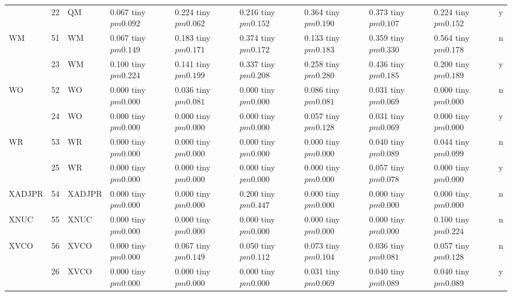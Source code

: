 \begin{table}
\begin{tabular}{llllllllll}
 & 22 & QM & 0.067 tiny $ pm 0.092$ & 0.224 tiny $ pm 0.062$ & 0.216 tiny $ pm 0.152$ & 0.364 tiny $ pm 0.190$ & 0.373 tiny $ pm 0.107$ & 0.224 tiny $ pm 0.152$ & y \\
\cline{1-10}
\multirow[t]{2}{*}{WM} & 51 & WM & 0.067 tiny $ pm 0.149$ & 0.183 tiny $ pm 0.171$ & 0.374 tiny $ pm 0.172$ & 0.133 tiny $ pm 0.183$ & 0.359 tiny $ pm 0.330$ & 0.564 tiny $ pm 0.178$ & n \\
 & 23 & WM & 0.100 tiny $ pm 0.224$ & 0.141 tiny $ pm 0.199$ & 0.337 tiny $ pm 0.208$ & 0.258 tiny $ pm 0.280$ & 0.436 tiny $ pm 0.185$ & 0.200 tiny $ pm 0.189$ & y \\
\cline{1-10}
\multirow[t]{2}{*}{WO} & 52 & WO & 0.000 tiny $ pm 0.000$ & 0.036 tiny $ pm 0.081$ & 0.000 tiny $ pm 0.000$ & 0.086 tiny $ pm 0.081$ & 0.031 tiny $ pm 0.069$ & 0.000 tiny $ pm 0.000$ & n \\
 & 24 & WO & 0.000 tiny $ pm 0.000$ & 0.000 tiny $ pm 0.000$ & 0.000 tiny $ pm 0.000$ & 0.057 tiny $ pm 0.128$ & 0.031 tiny $ pm 0.069$ & 0.000 tiny $ pm 0.000$ & y \\
\cline{1-10}
\multirow[t]{2}{*}{WR} & 53 & WR & 0.000 tiny $ pm 0.000$ & 0.000 tiny $ pm 0.000$ & 0.000 tiny $ pm 0.000$ & 0.000 tiny $ pm 0.000$ & 0.040 tiny $ pm 0.089$ & 0.044 tiny $ pm 0.099$ & n \\
 & 25 & WR & 0.000 tiny $ pm 0.000$ & 0.000 tiny $ pm 0.000$ & 0.000 tiny $ pm 0.000$ & 0.000 tiny $ pm 0.000$ & 0.057 tiny $ pm 0.078$ & 0.000 tiny $ pm 0.000$ & y \\
\cline{1-10}
XADJPR & 54 & XADJPR & 0.000 tiny $ pm 0.000$ & 0.000 tiny $ pm 0.000$ & 0.200 tiny $ pm 0.447$ & 0.000 tiny $ pm 0.000$ & 0.000 tiny $ pm 0.000$ & 0.000 tiny $ pm 0.000$ & n \\
\cline{1-10}
XNUC & 55 & XNUC & 0.000 tiny $ pm 0.000$ & 0.000 tiny $ pm 0.000$ & 0.000 tiny $ pm 0.000$ & 0.000 tiny $ pm 0.000$ & 0.000 tiny $ pm 0.000$ & 0.100 tiny $ pm 0.224$ & n \\
\cline{1-10}
\multirow[t]{2}{*}{XVCO} & 56 & XVCO & 0.000 tiny $ pm 0.000$ & 0.067 tiny $ pm 0.149$ & 0.050 tiny $ pm 0.112$ & 0.073 tiny $ pm 0.104$ & 0.036 tiny $ pm 0.081$ & 0.057 tiny $ pm 0.128$ & n \\
 & 26 & XVCO & 0.000 tiny $ pm 0.000$ & 0.000 tiny $ pm 0.000$ & 0.000 tiny $ pm 0.000$ & 0.031 tiny $ pm 0.069$ & 0.040 tiny $ pm 0.089$ & 0.040 tiny $ pm 0.089$ & y \\
\cline{1-10}
\bottomrule
\end{tabular}
\end{table}

